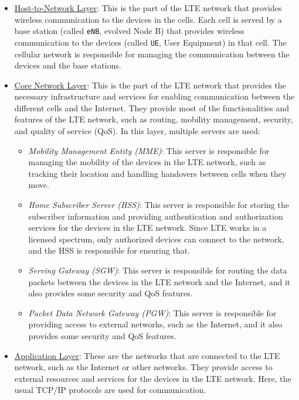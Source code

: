 \begin{itemize}
    \item \ul{Host-to-Network Layer}: This is the part of the LTE network that provides wireless communication to the devices in the cells. Each cell is served by a base station (called \texttt{eNB}, evolved Node B) that provides wireless communication to the devices (called \texttt{UE}, User Equipment) in that cell. The cellular network is responsible for managing the communication between the devices and the base stations.
    \item \ul{Core Network Layer}: This is the part of the LTE network that provides the necessary infrastructure and services for enabling communication between the different cells and the Internet. They provide most of the functionalities and features of the LTE network, such as routing, mobility management, security, and quality of service (QoS). In this layer, multiple servers are used:
    \begin{itemize}
        \item \emph{Mobility Management Entity (MME)}: This server is responsible for managing the mobility of the devices in the LTE network, such as tracking their location and handling handovers between cells when they move.
        \item \emph{Home Subscriber Server (HSS)}: This server is responsible for storing the subscriber information and providing authentication and authorization services for the devices in the LTE network. Since LTE works in a licensed spectrum, only authorized devices can connect to the network, and the HSS is responsible for ensuring that.
        \item \emph{Serving Gateway (SGW)}: This server is responsible for routing the data packets between the devices in the LTE network and the Internet, and it also provides some security and QoS features.
        \item \emph{Packet Data Network Gateway (PGW)}: This server is responsible for providing access to external networks, such as the Internet, and it also provides some security and QoS features.
    \end{itemize}
    \item \ul{Application Layer}: These are the networks that are connected to the LTE network, such as the Internet or other networks. They provide access to external resources and services for the devices in the LTE network. Here, the usual TCP/IP protocols are used for communication.
\end{itemize}

